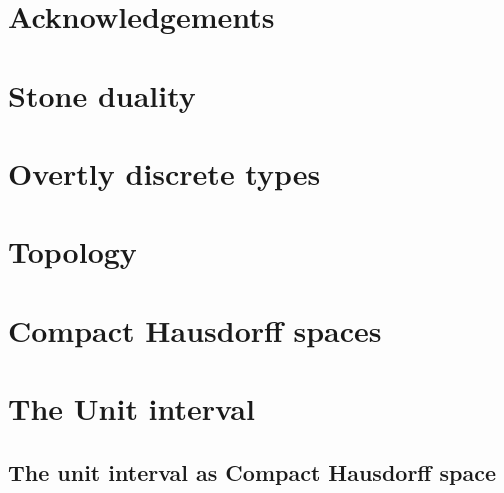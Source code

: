 \documentclass{../util/zariski}
\begin{document}
\section*{Acknowledgements}




\section{Stone duality}





\section{Overtly discrete types}

%
%

\section{Topology}





\section{Compact Hausdorff spaces}




\section{The Unit interval}
\subsection{The unit interval as Compact Hausdorff space}


 
\end{document}
